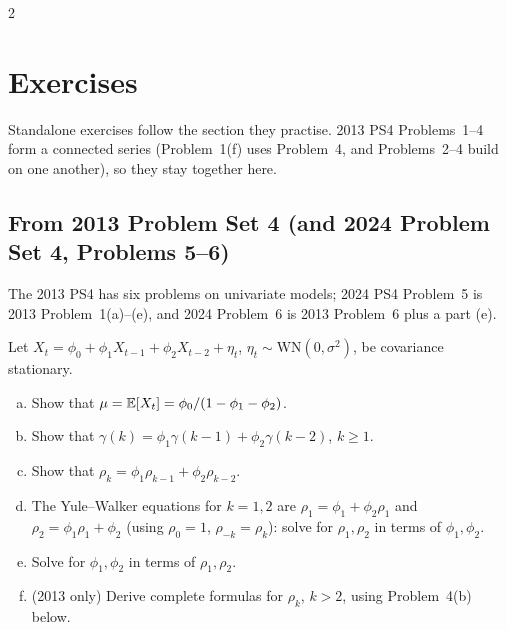 \begin{paracol}{2}
\section*{Exercises}
Standalone exercises follow the section they practise. 2013 PS4 Problems~1--4 form a connected series (Problem~1(f) uses Problem~4, and Problems~2--4 build on one another), so they stay together here.

\subsection*{From 2013 Problem Set 4 (and 2024 Problem Set 4, Problems 5--6)}
The 2013 PS4 has six problems on univariate models; 2024 PS4 Problem~5 is 2013 Problem~1(a)--(e), and 2024 Problem~6 is 2013 Problem~6 plus a part (e).

\begin{exercise}\label{ch09:ex-ps4-1}
Let $X_t=\phi_0+\phi_1X_{t-1}+\phi_2X_{t-2}+\eta_t$, $\eta_t\sim\mathrm{WN}(0,\sigma^2)$, be covariance stationary.
\begin{enumerate}[(a)]
  \item Show that $\mu=\mathbb{E}[X_t]=\phi_0/(1-\phi_1-\phi_2)$.
  \item Show that $\gamma(k)=\phi_1\gamma(k-1)+\phi_2\gamma(k-2)$, $k\ge1$.
  \item Show that $\rho_k=\phi_1\rho_{k-1}+\phi_2\rho_{k-2}$.
  \item The Yule--Walker equations for $k=1,2$ are $\rho_1=\phi_1+\phi_2\rho_1$ and $\rho_2=\phi_1\rho_1+\phi_2$ (using $\rho_0=1$, $\rho_{-k}=\rho_k$): solve for $\rho_1,\rho_2$ in terms of $\phi_1,\phi_2$.
  \item Solve for $\phi_1,\phi_2$ in terms of $\rho_1,\rho_2$.
  \item (2013 only) Derive complete formulas for $\rho_k$, $k>2$, using Problem~4(b) below.
\end{enumerate}
\end{exercise}


\end{paracol}
